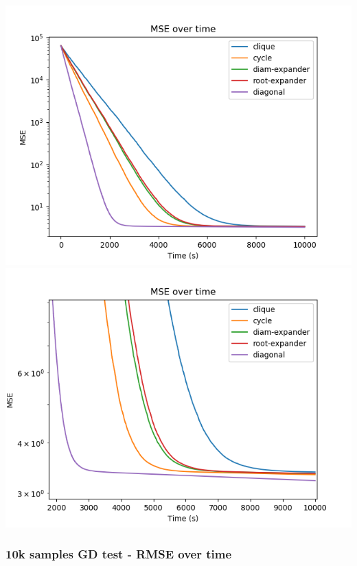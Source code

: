 \documentclass[11pt]{article}
\makeatletter
\def\maxwidth{\ifdim\Gin@nat@width>\linewidth\linewidth
    \else\Gin@nat@width\fi}
\let\Oldincludegraphics\includegraphics
\renewcommand{\includegraphics}[1]{\Oldincludegraphics[width=.8\maxwidth]{#1}}
\makeatother
\begin{document}
\includegraphics{media/img/tests/test_003_10ksamples_classic/3_mse_time.png}
\includegraphics{media/img/tests/test_003_10ksamples_classic/3_mse_time_zoom.png}

    \subsubsection{10k samples GD test - RMSE over
time}\label{k-samples-gd-test---rmse-over-time}
\end{document}
